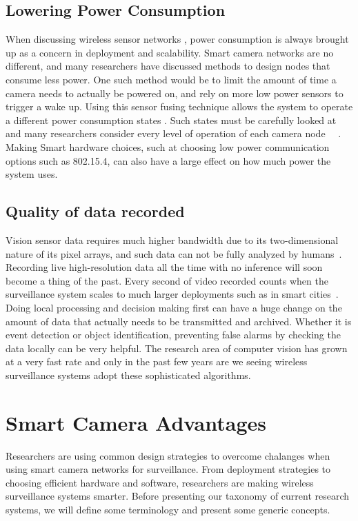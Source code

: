 \documentclass[journal,transmag]{IEEEtran}
\begin{document}
\subsection{Lowering Power Consumption}
 When discussing wireless sensor networks , power consumption is always brought up as a concern in deployment and scalability. Smart camera networks are 
no different, and many researchers have discussed methods to design nodes that consume less power. One such method would be to limit the amount of time 
a camera needs to actually be powered on, and rely on more low power sensors to trigger a wake up. Using this sensor fusing technique allows the system
to operate a different power consumption states . Such states must be carefully looked at and many researchers 
consider every level of operation of each camera node ~\cite{AccLatEnergy}~\cite{EnergyCons}. Making Smart hardware choices, such at choosing low power communication
options such as 802.15.4, can also have a large effect on how much power the system uses.

\subsection{Quality of data recorded}
Vision sensor data requires much higher bandwidth due to its two-dimensional nature of its pixel arrays, and such data can not be fully analyzed by humans~\cite{MeshEye}.
Recording live high-resolution data all the time with no inference will soon become a thing of the past. Every second of video recorded counts when the 
surveillance system scales to much larger deployments such as in smart cities~\cite{HuSIMS}. Doing local processing and decision making first can have 
a huge change on the amount of data that actually needs to be transmitted and archived. Whether it is event detection or object identification, preventing 
false alarms by checking the data locally can be very helpful. The research area of computer vision has grown at a very fast rate and only in the past few years
are we seeing wireless surveillance systems adopt these sophisticated algorithms.

\section{Smart Camera Advantages}

Researchers are using common design strategies to overcome chalanges when using smart camera networks for surveillance. From deployment strategies to choosing efficient
hardware and software, researchers are making wireless surveillance systems smarter. Before presenting our taxonomy of current research systems, we will define
some terminology and present some generic concepts.
\end{document}
